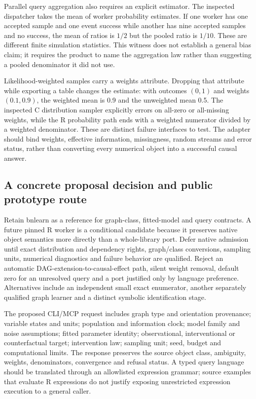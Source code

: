 Parallel query aggregation also requires an explicit estimator. The inspected dispatcher takes the mean of worker probability estimates. If one worker has one accepted sample and one event success while another has nine accepted samples and no success, the mean of ratios is $1/2$ but the pooled ratio is $1/10$. These are different finite simulation statistics. This witness does not establish a general bias claim; it requires the product to name the aggregation law rather than suggesting a pooled denominator it did not use.~\citep{exec24_bnlearn_sources,exec24_bnlearn_contract}

Likelihood-weighted samples carry a weights attribute. Dropping that attribute while exporting a table changes the estimate: with outcomes $(0,1)$ and weights $(0.1,0.9)$, the weighted mean is 0.9 and the unweighted mean 0.5. The inspected C distribution sampler explicitly errors on all-zero or all-missing weights, while the R probability path ends with a weighted numerator divided by a weighted denominator. These are distinct failure interfaces to test. The adapter should bind weights, effective information, missingness, random streams and error status, rather than converting every numerical object into a successful causal answer.~\citep{exec24_bnlearn_sources,exec24_bnlearn_contract}

\subsection{A concrete proposal decision and public prototype route}
Retain bnlearn as a reference for graph-class, fitted-model and query contracts. A future pinned R worker is a conditional candidate because it preserves native object semantics more directly than a whole-library port. Defer native admission until exact distribution and dependency rights, graph/class conversions, sampling units, numerical diagnostics and failure behavior are qualified. Reject an automatic DAG-extension-to-causal-effect path, silent weight removal, default zero for an unresolved query and a port justified only by language preference. Alternatives include an independent small exact enumerator, another separately qualified graph learner and a distinct symbolic identification stage.~\citep{exec24_bnlearn_contract}

The proposed CLI/MCP request includes graph type and orientation provenance; variable states and units; population and information clock; model family and noise assumptions; fitted parameter identity; observational, interventional or counterfactual target; intervention law; sampling unit; seed, budget and computational limits. The response preserves the source object class, ambiguity, weights, denominators, convergence and refusal status. A typed query language should be translated through an allowlisted expression grammar; source examples that evaluate R expressions do not justify exposing unrestricted expression execution to a general caller.~\citep{exec24_bnlearn_sources,exec24_bnlearn_contract}

